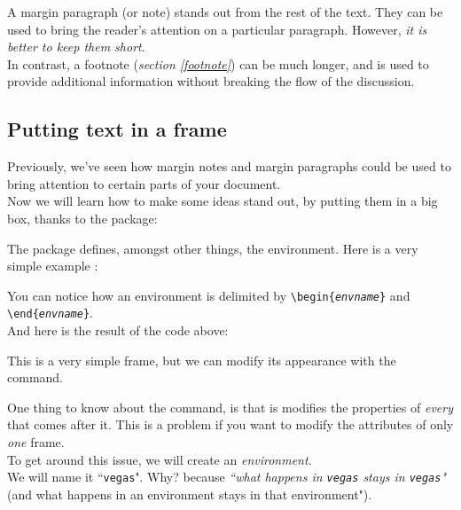 A 
margin paragraph (or note) stands out from the rest of the text. 
They can be used to bring the reader's attention on a particular paragraph. However, \emph{it is better to keep them short}. \\

In contrast, a footnote (\emph{section \ref{footnote}}) can be much longer, and is used to provide additional information without breaking the flow of the discussion.
\newpage



\subsection{Putting text in a frame} \label{mdframed}

Previously, we've seen how margin notes and margin paragraphs could be used to bring attention to certain parts of your document. \\

Now we will learn how to make some ideas stand out, by putting them in a big box, thanks to the  package:


\bigskip

The  package defines, amongst other things, the  environment. Here is a very simple example :


You can notice how an environment is delimited by \texttt{\textbackslash begin\{\emph{envname}\}} and \\
\texttt{\textbackslash end\{\emph{envname}\}}. \\

And here is the result of the code above:



\bigskip



This is a very simple frame, but we can modify its appearance with the  command.

One thing to know about the  command, is that is modifies the properties of \emph{every}  that comes after it. This is a problem if you want to modify the attributes of only \emph{one} frame. \\


To get around this issue, we will create an \emph{environment}. \\
We will name it ``\texttt{vegas}". Why? because \emph{``what happens in \emph{\texttt{vegas}} stays in \emph{\texttt{vegas}}"} (and what happens in an environment stays in that environment"). \\

